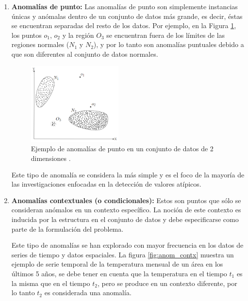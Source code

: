\begin{enumerate}[1.]

\item \textbf{Anomal\'{i}as de punto: }Las anomalías de punto son simplemente instancias únicas y anómalas dentro de un conjunto de datos más grande, es decir, \'{e}stas se encuentran separadas del resto de los datos. Por ejemplo, en la Figura \ref{fig:anom_2D}, los puntos $o_1$, $o_2$ y la regi\'{o}n $O_3$ se encuentran fuera de los l\'{i}mites de las regiones normales ($N_1$ y $N_2$), y por lo tanto son anomal\'{i}as puntuales debido a que son diferentes al conjunto de datos normales.

\begin{figure}[h!]
  \begin{center}	\includegraphics[width=0.45\textwidth,frame]{imagenes/Cap2/anom_2D}
  \caption{Ejemplo de anomal\'{i}as de punto en un conjunto de datos de 2 dimensiones \protect\cite{Reference66}.}
  \label{fig:anom_2D}
  \end{center}
\end{figure}

\vspace{5mm} %

Este tipo de anomal\'{i}a se considera la m\'{a}s simple y es el foco de la mayor\'{i}a de las investigaciones enfocadas en la detecci\'{o}n de valores at\'{i}picos.

\item \textbf{Anomal\'{i}as contextuales (o condicionales): }Estos son puntos que s\'{o}lo se consideran anómalos en un contexto espec\'{i}fico. La noci\'{o}n de este contexto es inducida por la estructura en el conjunto de datos y debe especificarse como parte de la formulaci\'{o}n del problema.

\vspace{5mm} %

Este tipo de anomal\'{i}as se han explorado con mayor frecuencia en los datos de series de tiempo y datos espaciales. La figura \ref{fig:anom_contx} muestra un ejemplo de serie temporal de la temperatura mensual de un \'{a}rea en los \'{u}ltimos 5 a\~{n}os, se debe tener en cuenta que la temperatura en el tiempo $t_1$ es la misma que en el tiempo $t_2$, pero se produce en un contexto diferente, por lo tanto $t_2$ es considerada una anomal\'{i}a.


\end{enumerate}

